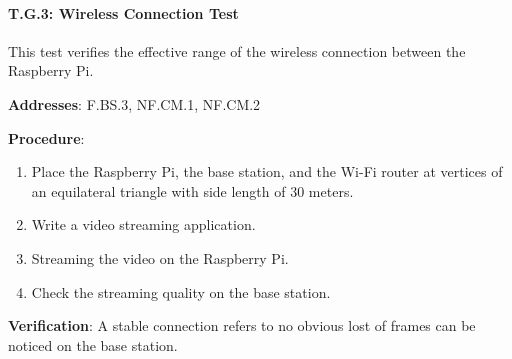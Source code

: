 %

\paragraph{T.G.3: Wireless Connection Test}

This test verifies the effective range of the wireless connection between the Raspberry Pi.

\textbf{Addresses}: F.BS.3, NF.CM.1, NF.CM.2

\textbf{Procedure}:
\begin{enumerate}[noitemsep]
    \item Place the Raspberry Pi, the base station, and the Wi-Fi router at vertices of an equilateral triangle with side length of 30 meters.
    \item Write a video streaming application.
    \item Streaming the video on the Raspberry Pi.
    \item Check the streaming quality on the base station.
\end{enumerate}

\textbf{Verification}: 
A stable connection refers to no obvious lost of frames can be noticed on the base station.
